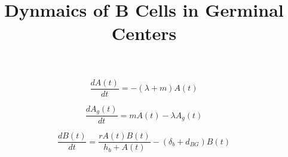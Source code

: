 \documentclass[letterpaper,12pt]{article}
\begin{document}
\title{Dynmaics of B Cells in Germinal Centers}

\begin{equation}\label{eq1}
\frac{dA(t)}{dt}  = -(\lambda + m)A(t)
\end{equation}

\begin{equation}\label{eq2}
\frac{dA_g(t)}{dt}  = mA(t) - \lambda A_g(t)
\end{equation}

\begin{equation}\label{eq3}
    \frac{dB(t)}{dt}  = \frac{rA(t)B(t)}{h_b+A(t)} -(\delta_b+d_{BG})B(t)
\end{equation}
\end{document}
